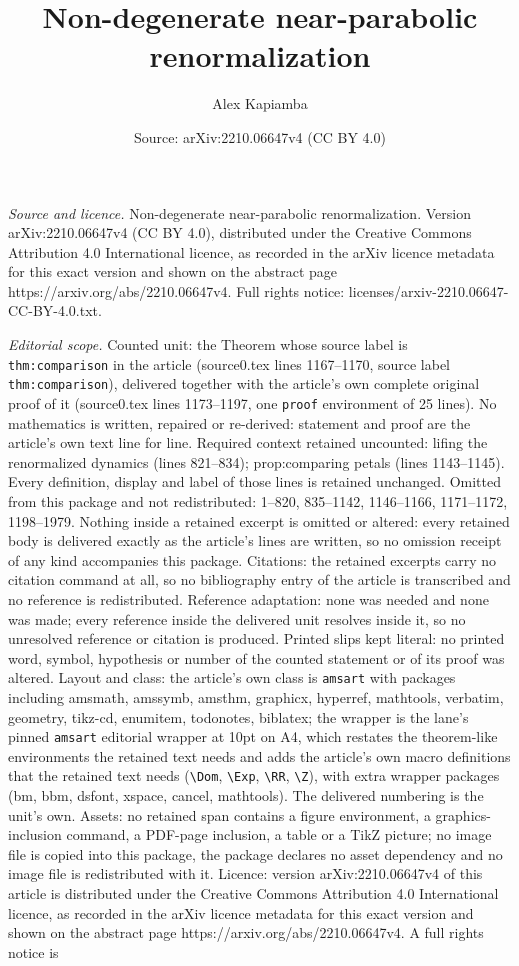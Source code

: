 \documentclass[10pt,a4paper]{amsart}
\title[Non-degenerate near-parabolic renormalization]{Non-degenerate near-parabolic renormalization}
\author{Alex Kapiamba}
\date{Source: arXiv:2210.06647v4 (CC BY 4.0)}
\begin{document}
\maketitle

\noindent\emph{Source and licence.} Non-degenerate near-parabolic renormalization. Version arXiv:2210.06647v4 (CC BY 4.0), distributed under the Creative Commons Attribution 4.0 International licence, as recorded in the arXiv licence metadata for this exact version and shown on the abstract page https://arxiv.org/abs/2210.06647v4. Full rights notice: licenses/arxiv-2210.06647-CC-BY-4.0.txt.\par\smallskip

\noindent\textit{Editorial scope.} Counted unit: the Theorem whose source label is \texttt{thm:comparison} in the article (source0.tex lines 1167--1170, source label \texttt{thm:comparison}), delivered together with the article's own complete original proof of it (source0.tex lines 1173--1197, one \texttt{proof} environment of 25 lines). No mathematics is written, repaired or re-derived: statement and proof are the article's own text line for line. Required context retained uncounted: lifing the renormalized dynamics (lines 821--834); prop:comparing petals (lines 1143--1145). Every definition, display and label of those lines is retained unchanged. Omitted from this package and not redistributed: 1--820, 835--1142, 1146--1166, 1171--1172, 1198--1979. Nothing inside a retained excerpt is omitted or altered: every retained body is delivered exactly as the article's lines are written, so no omission receipt of any kind accompanies this package. Citations: the retained excerpts carry no citation command at all, so no bibliography entry of the article is transcribed and no reference is redistributed. Reference adaptation: none was needed and none was made; every reference inside the delivered unit resolves inside it, so no unresolved reference or citation is produced. Printed slips kept literal: no printed word, symbol, hypothesis or number of the counted statement or of its proof was altered. Layout and class: the article's own class is \texttt{amsart} with packages including amsmath, amssymb, amsthm, graphicx, hyperref, mathtools, verbatim, geometry, tikz-cd, enumitem, todonotes, biblatex; the wrapper is the lane's pinned \texttt{amsart} editorial wrapper at 10pt on A4, which restates the theorem-like environments the retained text needs and adds the article's own macro definitions that the retained text needs (\texttt{\textbackslash Dom}, \texttt{\textbackslash Exp}, \texttt{\textbackslash RR}, \texttt{\textbackslash Z}), with extra wrapper packages (bm, bbm, dsfont, xspace, cancel, mathtools). The delivered numbering is the unit's own. Assets: no retained span contains a figure environment, a graphics-inclusion command, a PDF-page inclusion, a table or a TikZ picture; no image file is copied into this package, the package declares no asset dependency and no image file is redistributed with it. Licence: version arXiv:2210.06647v4 of this article is distributed under the Creative Commons Attribution 4.0 International licence, as recorded in the arXiv licence metadata for this exact version and shown on the abstract page https://arxiv.org/abs/2210.06647v4. A full rights notice is 
\end{document}
